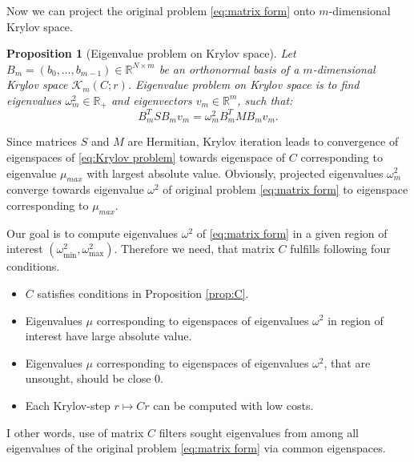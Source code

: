 \documentclass[a4paper,11pt,bibliography=totoc,listof=totoc,headinclude=true,cleardoublepage=empty,oneside]{scrbook}
\newtheorem{prop}[theorem]{Proposition}
\newcommand{\R}{\mathbb{R}}
\begin{document}
Now we can project the original problem \eqref{eq:matrix form} onto $m$-dimensional Krylov space. 
\begin{prop}[Eigenvalue problem on Krylov space]
    Let $B_m = (b_0, \dots, b_{m-1}) \in \R^{N\times m}$ be an orthonormal basis of a $m$-dimensional Krylov space $\mathcal{K}_m(C; r)$. Eigenvalue problem on Krylov space is to find eigenvalues $\omega_m^2 \in \R_+$ and eigenvectors $v_m\in\R^m$, such that:
    \begin{equation}\label{eq:Krylov problem}
        B_m^T S B_m v_m = \omega_m^2 B_m^T M B_m v_m.
    \end{equation}
\end{prop}

Since matrices $S$ and $M$ are Hermitian, Krylov iteration leads to convergence of eigenspaces of \eqref{eq:Krylov problem} towards eigenspace of $C$ corresponding to eigenvalue $\mu_{max}$ with largest absolute value. Obviously, projected eigenvalues $\omega_m^2$ converge towards eigenvalue $\omega^2$ of original problem \eqref{eq:matrix form} to eigenspace corresponding to $\mu_{max}$.


Our goal is to compute eigenvalues $\omega^2$ of \eqref{eq:matrix form} in a given region of interest $(\omega_{\min}^2, \omega_{\max}^2)$. Therefore we need, that matrix $C$ fulfills following four conditions.
\begin{itemize}
    \item $C$ satisfies conditions in Proposition \ref{prop:C}.
    \item Eigenvalues $\mu$ corresponding to eigenspaces of eigenvalues $\omega^2$ in region of interest have large absolute value.
    \item Eigenvalues $\mu$ corresponding to eigenspaces of eigenvalues $\omega^2$, that are unsought, should be close 0. 
    \item Each Krylov-step $r \mapsto Cr$ can be computed with low costs.
\end{itemize}
I other words, use of matrix $C$ filters sought eigenvalues from among all eigenvalues of the original problem \eqref{eq:matrix form} via common eigenspaces. 
\end{document}
